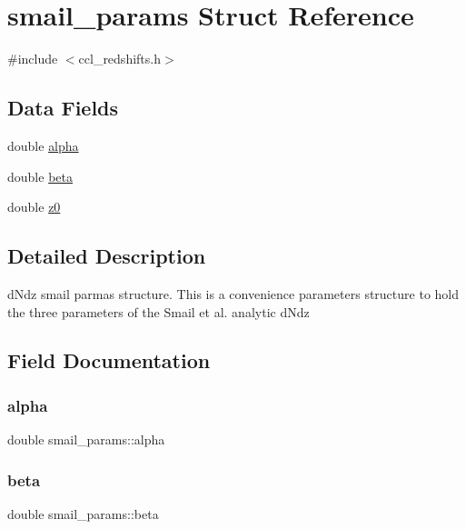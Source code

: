 \hypertarget{structsmail__params}{}\section{smail\+\_\+params Struct Reference}
\label{structsmail__params}


{\ttfamily \#include $<$ccl\+\_\+redshifts.\+h$>$}

\subsection*{Data Fields}
\begin{DoxyCompactItemize}
\item 
double \mbox{\hyperlink{structsmail__params_acd8cd1e6aa420da9133e41207c675811}{alpha}}
\item 
double \mbox{\hyperlink{structsmail__params_a2d8876ee5af0480171718ae0918b52f5}{beta}}
\item 
double \mbox{\hyperlink{structsmail__params_a41e25302d48c03f63cfdfcae8c19789a}{z0}}
\end{DoxyCompactItemize}


\subsection{Detailed Description}
d\+Ndz smail parmas structure. This is a convenience parameters structure to hold the three parameters of the Smail et al. analytic d\+Ndz 

\subsection{Field Documentation}
\mbox{\label{structsmail__params_acd8cd1e6aa420da9133e41207c675811}} 
\subsubsection{\texorpdfstring{alpha}{alpha}}
{\footnotesize\ttfamily double smail\+\_\+params\+::alpha}

\mbox{\label{structsmail__params_a2d8876ee5af0480171718ae0918b52f5}} 
\subsubsection{\texorpdfstring{beta}{beta}}
{\footnotesize\ttfamily double smail\+\_\+params\+::beta}

